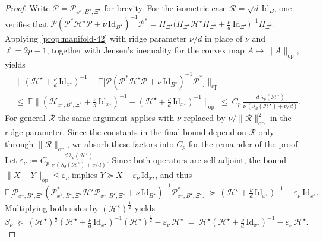 \documentclass[final,onefignum,onetabnum]{siamart250211}
\begin{document}
\begin{proof}
    Write $\mathcal P=\mathcal P_{x^\star,B^\star,\Xi^\star}$ for brevity. For the isometric case $\mathcal R=\sqrt{d}\,\mathrm{Id}_B$, one verifies that $\mathcal P(\mathcal P^{*}\mathcal{H}^\star\mathcal P+\nu\,\mathrm{Id}_{B^\star})^{-1}\mathcal P^{*}=\Pi_{\Xi^\star}\big(\Pi_{\Xi^\star}\mathcal{H}^\star\Pi_{\Xi^\star}+\tfrac{\nu}{d}\,\mathrm{Id}_{\Xi^\star}\big)^{-1}\Pi_{\Xi^\star}$. Applying \cref{prop:manifold-42} with ridge parameter $\nu/d$ in place of $\nu$ and $\ell=2p-1$, together with Jensen's inequality for the convex map $A\mapsto \|A\|_{\mathrm{op}}$, yields
    \begin{align*}
    &\Big\|(\mathcal{H}^\star+\tfrac{\nu}{d}\,\mathrm{Id}_{x^\star})^{-1}
    -\mathbb E\big[\mathcal P(\mathcal P^{*}\mathcal{H}^\star \mathcal P+\nu\,\mathrm{Id}_{B^\star})^{-1}\mathcal P^{*}\big]\Big\|_{\mathrm{op}}\\
    &\le\ \mathbb E\Big\|(\mathcal{H}_{x^\star,B^\star,\Xi^\star}+\tfrac{\nu}{d}\,\mathrm{Id}_{x^\star})^{-1}
    -(\mathcal{H}^\star+\tfrac{\nu}{d}\,\mathrm{Id}_{x^\star})^{-1}\Big\|_{\mathrm{op}}
    \ \le\ C_p\,\frac{d\,\lambda_p(\mathcal{H}^\star)}{\nu\,(\lambda_d(\mathcal{H}^\star)+\nu/d)}.
    \end{align*}
    For general $\mathcal R$ the same argument applies with $\nu$ replaced by $\nu/\|\mathcal R\|_{\mathrm{op}}^{2}$ in the ridge parameter. Since the constants in the final bound depend on $\mathcal R$ only through $\|\mathcal R\|_{\mathrm{op}}$, we absorb these factors into $C_p$ for the remainder of the proof.
    Let $\varepsilon_{\nu}:=C_p\,\frac{d\,\lambda_p(\mathcal{H}^\star)}{\nu\,(\lambda_d(\mathcal{H}^\star)+\nu/d)}$. Since both operators are self-adjoint, the bound $\|X-Y\|_{\mathrm{op}}\le \varepsilon_{\nu}$ implies $Y\succeq X-\varepsilon_{\nu}\,\mathrm{Id}_{x^\star}$, and thus
    \[
    \mathbb E\big[\mathcal{P}_{x^\star, B^\star, \Xi^\star}(\mathcal{P}_{x^\star, B^\star, \Xi^\star}^{*}\mathcal{H}^\star \mathcal{P}_{x^\star, B^\star, \Xi^\star}+\nu\,\mathrm{Id}_{B^\star})^{-1}\mathcal{P}_{x^\star, B^\star, \Xi^\star}^{*}\big]
    \ \succeq\ (\mathcal{H}^\star+\tfrac{\nu}{d}\,\mathrm{Id}_{x^\star})^{-1}-\varepsilon_{\nu}\,\mathrm{Id}_{x^\star}.
    \]
    Multiplying both sides by $(\mathcal{H}^\star)^{\frac{1}{2}}$ yields
    \[
    S_{\nu}\ \succeq\ (\mathcal{H}^\star)^{\frac{1}{2}}(\mathcal{H}^\star+\tfrac{\nu}{d}\,\mathrm{Id}_{x^\star})^{-1}(\mathcal{H}^\star)^{\frac{1}{2}}-\varepsilon_{\nu}\,\mathcal{H}^\star
    \ =\ \mathcal{H}^\star(\mathcal{H}^\star+\tfrac{\nu}{d}\,\mathrm{Id}_{x^\star})^{-1}-\varepsilon_{\nu}\,\mathcal{H}^\star.
\]
\end{proof}
\end{document}
